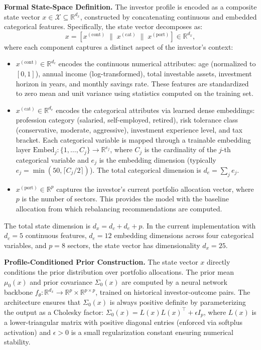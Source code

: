 \documentclass[12pt,a4paper,oneside]{report}
\theoremstyle{definition}
\theoremstyle{remark}
\begin{document}
\medskip
\noindent\textbf{Formal State-Space Definition.}
The investor profile is encoded as a composite state vector $x \in \mathcal{X} \subseteq \mathbb{R}^{d_x}$, constructed by concatenating continuous and embedded categorical features. Specifically, the state vector decomposes as:
\[
x = \left[ x^{(\text{cont})} \;\|\; x^{(\text{cat})} \;\|\; x^{(\text{port})} \right] \in \mathbb{R}^{d_x},
\]
where each component captures a distinct aspect of the investor's context:
\begin{itemize}[leftmargin=2em]
  \item $x^{(\text{cont})} \in \mathbb{R}^{d_c}$ encodes the continuous numerical attributes: age (normalized to $[0,1]$), annual income (log-transformed), total investable assets, investment horizon in years, and monthly savings rate. These features are standardized to zero mean and unit variance using statistics computed on the training set.
  \item $x^{(\text{cat})} \in \mathbb{R}^{d_e}$ encodes the categorical attributes via learned dense embeddings: profession category (salaried, self-employed, retired), risk tolerance class (conservative, moderate, aggressive), investment experience level, and tax bracket. Each categorical variable is mapped through a trainable embedding layer $\text{Embed}_j : \{1, \ldots, C_j\} \to \mathbb{R}^{e_j}$, where $C_j$ is the cardinality of the $j$-th categorical variable and $e_j$ is the embedding dimension (typically $e_j = \min(50, \lceil C_j / 2 \rceil)$). The total categorical dimension is $d_e = \sum_j e_j$.
  \item $x^{(\text{port})} \in \mathbb{R}^{p}$ captures the investor's current portfolio allocation vector, where $p$ is the number of sectors. This provides the model with the baseline allocation from which rebalancing recommendations are computed.
\end{itemize}
\noindent The total state dimension is $d_x = d_c + d_e + p$. In the current implementation with $d_c = 5$ continuous features, $d_e = 12$ embedding dimensions across four categorical variables, and $p = 8$ sectors, the state vector has dimensionality $d_x = 25$.

\medskip
\noindent\textbf{Profile-Conditioned Prior Construction.}
The state vector $x$ directly conditions the prior distribution over portfolio allocations. The prior mean $\mu_0(x)$ and prior covariance $\Sigma_0(x)$ are computed by a neural network backbone $f_\theta : \mathbb{R}^{d_x} \to \mathbb{R}^p \times \mathbb{R}^{p \times p}$, trained on historical investor-outcome pairs. The architecture ensures that $\Sigma_0(x)$ is always positive definite by parameterizing the output as a Cholesky factor: $\Sigma_0(x) = L(x) L(x)^\top + \epsilon I_p$, where $L(x)$ is a lower-triangular matrix with positive diagonal entries (enforced via softplus activation) and $\epsilon > 0$ is a small regularization constant ensuring numerical stability.
\end{document}
